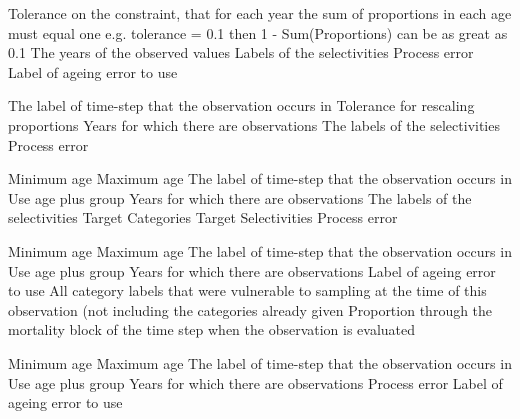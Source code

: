  {Tolerance on the constraint, that for each year the sum of proportions in each age must equal one e.g. tolerance = 0.1 then 1 - Sum(Proportions) can be as great as 0.1}
 {The years of the observed values}
 {Labels of the selectivities}
 {Process error}
 {Label of ageing error to use}
\par\textbf{}\par
{} {The label of time-step that the observation occurs in}
 {Tolerance for rescaling proportions}
 {Years for which there are observations}
 {The labels of the selectivities}
 {Process error}
\par\textbf{}\par
{} {Minimum age}
 {Maximum age}
 {The label of time-step that the observation occurs in}
 {Use age plus group}
 {Years for which there are observations}
 {The labels of the selectivities}
 {Target Categories}
 {Target Selectivities}
 {Process error}
\par\textbf{}\par
{} {Minimum age}
 {Maximum age}
 {The label of time-step that the observation occurs in}
 {Use age plus group}
 {Years for which there are observations}
 {Label of ageing error to use}
 {All category labels that were vulnerable to sampling at the time of this observation (not including the categories already given}
 {Proportion through the mortality block of the time step when the observation is evaluated}
\par\textbf{}\par
{} {Minimum age}
 {Maximum age}
 {The label of time-step that the observation occurs in}
 {Use age plus group}
 {Years for which there are observations}
 {Process error}
 {Label of ageing error to use}
